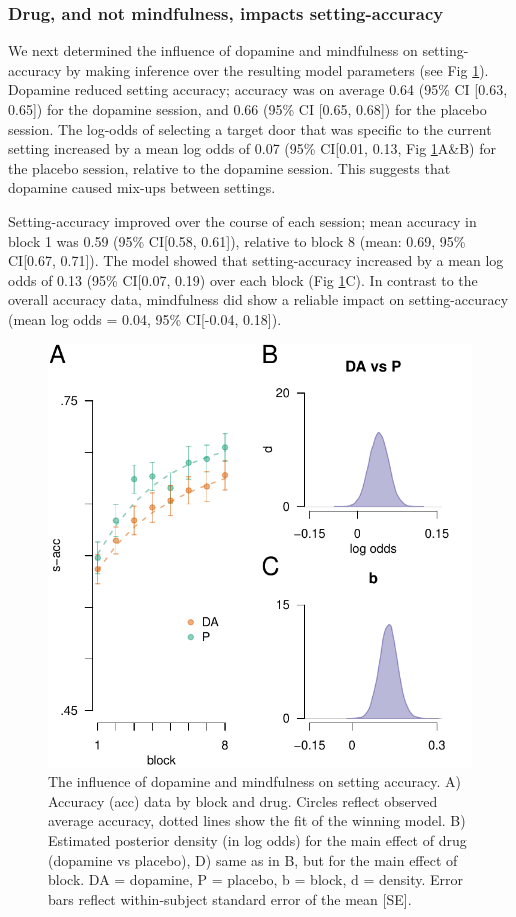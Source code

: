 \documentclass{article}
\begin{document}
\hypertarget{drug-and-not-mindfulness-impacts-setting-accuracy}{%
\subsubsection{Drug, and not mindfulness, impacts
setting-accuracy}\label{drug-and-not-mindfulness-impacts-setting-accuracy}}

We next determined the influence of dopamine and mindfulness on
setting-accuracy by making inference over the resulting model parameters
(see Fig \ref{fig:caccfig}). Dopamine reduced setting accuracy; accuracy
was on average 0.64 (95\% CI {[}0.63, 0.65{]}) for the dopamine session,
and 0.66 (95\% CI {[}0.65, 0.68{]}) for the placebo session. The
log-odds of selecting a target door that was specific to the current
setting increased by a mean log odds of 0.07 (95\% CI{[}0.01, 0.13, Fig
\ref{fig:caccfig}A\&B) for the placebo session, relative to the dopamine
session. This suggests that dopamine caused mix-ups between settings.

Setting-accuracy improved over the course of each session; mean accuracy
in block 1 was 0.59 (95\% CI{[}0.58, 0.61{]}), relative to block 8
(mean: 0.69, 95\% CI{[}0.67, 0.71{]}). The model showed that
setting-accuracy increased by a mean log odds of 0.13 (95\% CI{[}0.07,
0.19) over each block (Fig \ref{fig:caccfig}C). In contrast to the
overall accuracy data, mindfulness did show a reliable impact on
setting-accuracy (mean log odds = 0.04, 95\% CI{[}-0.04, 0.18{]}).

\begin{figure}

{\centering \includegraphics[width=0.7\linewidth]{../../images/cacc_fig} 

}

\caption{The influence of dopamine and mindfulness on setting accuracy. A) Accuracy (acc) data by block and drug. Circles reflect observed average accuracy, dotted lines show the fit of the winning model. B) Estimated posterior density (in log odds) for the main effect of drug (dopamine vs placebo), D) same as in B, but for the main effect of block. DA = dopamine, P = placebo, b = block, d = density. Error bars reflect within-subject standard error of the mean [SE].}\label{fig:caccfig}
\end{figure}
\end{document}
